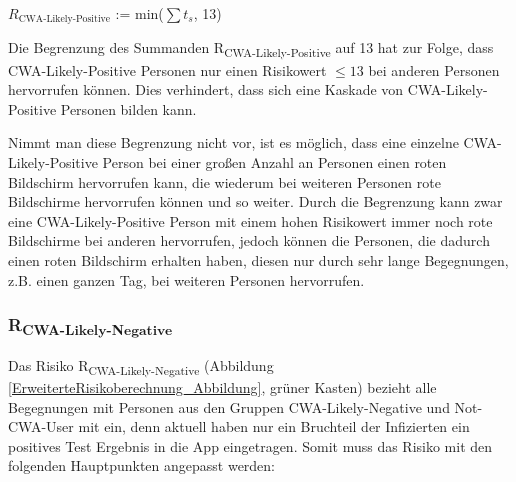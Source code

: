 \documentclass[conference,compsoc]{IEEEtran}
\begin{document}
\centerline{\text{ }}
\centerline{$R_{\text{CWA-Likely-Positive}}$ := min($\sum t_s$, 13)}
\centerline{\text{ }}

Die Begrenzung des Summanden R\textsubscript{CWA-Likely-Positive} auf 13 hat zur Folge, 
dass CWA-Likely-Positive Personen nur einen Risikowert $\le 13$ bei anderen Personen hervorrufen können. 
Dies verhindert, dass sich eine Kaskade von CWA-Likely-Positive Personen bilden kann. 

Nimmt man diese Begrenzung nicht vor, 
ist es möglich, dass eine einzelne CWA-Likely-Positive Person bei einer großen Anzahl an Personen einen roten Bildschirm hervorrufen kann, 
die wiederum bei weiteren Personen rote Bildschirme hervorrufen können und so weiter. 
Durch die Begrenzung kann zwar eine CWA-Likely-Positive Person mit einem hohen Risikowert immer noch rote Bildschirme bei anderen hervorrufen, 
jedoch können die Personen, die dadurch einen roten Bildschirm erhalten haben, diesen nur durch sehr lange Begegnungen, z.B. einen ganzen Tag, bei weiteren Personen hervorrufen.\\

\subsubsection{R\textsubscript{CWA-Likely-Negative}}
\label{CWALikelyNegative}

Das Risiko R\textsubscript{CWA-Likely-Negative} (Abbildung \ref{ErweiterteRisikoberechnung_Abbildung}, grüner Kasten) bezieht alle Begegnungen mit Personen aus den Gruppen CWA-Likely-Negative und Not-CWA-User mit ein,
denn aktuell haben nur ein Bruchteil der Infizierten ein positives Test Ergebnis in die App eingetragen. 
Somit muss das Risiko mit den folgenden Hauptpunkten angepasst werden:
\end{document}
